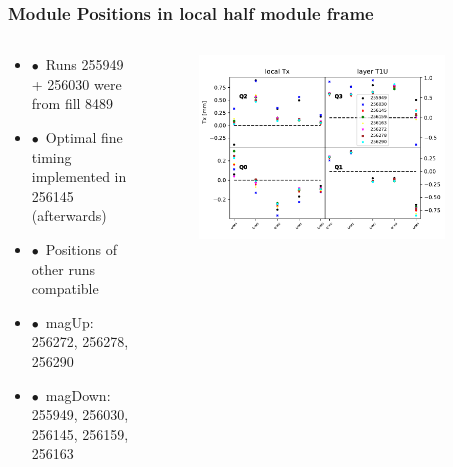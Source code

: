 \documentclass[aspectratio=1610, 12pt, xcolor=dvipsnames]{beamer}
\begin{document}
\begin{frame}\frametitle{Module Positions in local half module frame}
  \begin{columns}
    \begin{column}[c]{0.35\textwidth}
      \begin{itemize}
        \setlength\itemsep{0em}
        \item $\bullet$\, Runs 255949 + 256030 were from fill 8489
        \item $\bullet$\, Optimal fine timing implemented in 256145 (afterwards)
        \item $\bullet$\, Positions of other runs compatible
        \item $\bullet$\, magUp: 256272, 256278, 256290
        \item $\bullet$\, magDown: 255949, 256030, 256145, 256159, 256163
      \end{itemize}
    \end{column}
    \begin{column}[c]{0.65\textwidth}
      \begin{figure}
        \includegraphics[width=0.9\textwidth]{plots/plain_data/raw_data_T1U_Tx.pdf}
      \end{figure}
    \end{column}
  \end{columns}
\end{frame}
\end{document}
